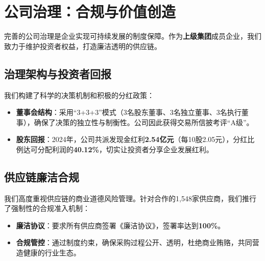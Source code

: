 \documentclass[a4paper,12pt]{article}
\begin{document}
\section{公司治理：合规与价值创造}

完善的公司治理是企业实现可持续发展的制度保障。作为\textbf{上级集团}成员企业，我们致力于维护投资者权益，打造廉洁透明的供应链。

\subsection{治理架构与投资者回报}

我们构建了科学的决策机制和积极的分红政策：
\begin{itemize}
    \item \textbf{董事会结构}：采用“3+3+3”模式（3名股东董事、3名独立董事、3名执行董事），确保了决策的独立性与制衡性。公司因此获得交易所信披考评“A级”。
    \item \textbf{股东回报}：2024年，公司共派发现金红利\textbf{2.54亿元}（每10股2.05元），分红比例达可分配利润的\textbf{40.12\%}，切实让投资者分享企业发展红利。
\end{itemize}

\subsection{供应链廉洁合规}

我们高度重视供应链的商业道德风险管理。针对合作的1,548家供应商，我们推行了强制性的合规准入机制：
\begin{itemize}
    \item \textbf{廉洁协议}：要求所有供应商签署《廉洁协议》，签署率达到\textbf{100\%}。
    \item \textbf{合规管控}：通过制度约束，确保采购过程公开、透明，杜绝商业贿赂，共同营造健康的行业生态。
\end{itemize}
\end{document}
